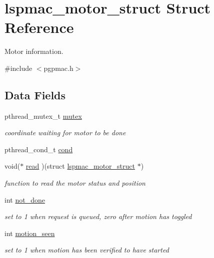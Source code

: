 \hypertarget{structlspmac__motor__struct}{
\section{lspmac\_\-motor\_\-struct Struct Reference}
\label{structlspmac__motor__struct}
}


Motor information.  


{\ttfamily \#include $<$pgpmac.h$>$}\subsection*{Data Fields}
\begin{DoxyCompactItemize}
\item 
pthread\_\-mutex\_\-t \hyperlink{structlspmac__motor__struct_a188c5b1e991750ce2ffd53e0192e0907}{mutex}
\begin{DoxyCompactList}\small\item\em coordinate waiting for motor to be done \item\end{DoxyCompactList}\item 
pthread\_\-cond\_\-t \hyperlink{structlspmac__motor__struct_aa0ea4108b8fed5b41ff91ca7266f3d84}{cond}
\item 
void($\ast$ \hyperlink{structlspmac__motor__struct_ac62692eb939c04ca35e939d1c3acfe8f}{read} )(struct \hyperlink{structlspmac__motor__struct}{lspmac\_\-motor\_\-struct} $\ast$)
\begin{DoxyCompactList}\small\item\em function to read the motor status and position \item\end{DoxyCompactList}\item 
int \hyperlink{structlspmac__motor__struct_ab7bd8bff48953ce05c758598d75877ac}{not\_\-done}
\begin{DoxyCompactList}\small\item\em set to 1 when request is queued, zero after motion has toggled \item\end{DoxyCompactList}\item 
int \hyperlink{structlspmac__motor__struct_a68c471836f52707fa8582f7860cf500f}{motion\_\-seen}
\begin{DoxyCompactList}\small\item\em set to 1 when motion has been verified to have started \item\end{DoxyCompactList}\item 

\end{DoxyCompactItemize}
